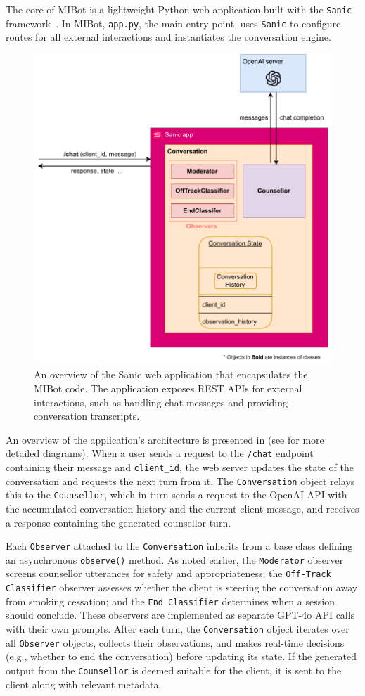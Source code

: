 The core of MIBot is a lightweight Python web application built with the \texttt{Sanic} framework~\citep{pi_sanic}. In MIBot, \texttt{app.py}, the main entry point, uses \texttt{Sanic} to configure routes for all external interactions and instantiates the conversation engine.
\begin{figure}[ht]
	\centering
	\includegraphics[width=0.7\linewidth]{fig/microservice.drawio.pdf}
	\caption[MIBot Sanic Application Overview]{An overview of the Sanic web application that encapsulates the MIBot code. The application exposes REST APIs for external interactions, such as handling chat messages and providing conversation transcripts.}
	\label{fig:microservice}
\end{figure}
An overview of the application's architecture is presented in  (see  for more detailed diagrams). When a user sends a request to the \texttt{/chat} endpoint containing their message and \texttt{client\_id}, the web server updates the state of the conversation and requests the next turn from it. The \texttt{Conversation} object relays this to the \texttt{Counsellor}, which in turn sends a request to the OpenAI API with the accumulated conversation history and the current client message, and receives a response containing the generated counsellor turn.

Each \texttt{Observer} attached to the \texttt{Conversation} inherits from a base class defining an asynchronous \texttt{observe()} method. As noted earlier, the \texttt{Moderator} observer screens counsellor utterances for safety and appropriateness; the \texttt{Off-Track Classifier} observer assesses whether the client is steering the conversation away from smoking cessation; and the \texttt{End Classifier} determines when a session should conclude. These observers are implemented as separate GPT-4o API calls with their own prompts. After each turn, the \texttt{Conversation} object iterates over all \texttt{Observer} objects, collects their observations, and makes real-time decisions (e.g., whether to end the conversation) before updating its state. If the generated output from the \texttt{Counsellor} is deemed suitable for the client, it is sent to the client along with relevant metadata.

